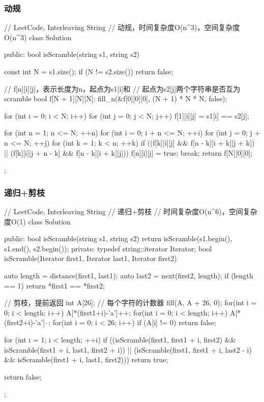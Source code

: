 \subsubsection{动规}
\begin{Code}
// LeetCode, Interleaving String
// 动规，时间复杂度O(n^3)，空间复杂度O(n^3)
class Solution {
public:
    bool isScramble(string s1, string s2) {
        const int N = s1.size();
        if (N != s2.size()) return false;

        // f[n][i][j]，表示长度为n，起点为s1[i]和
        // 起点为s2[j]两个字符串是否互为scramble
        bool f[N + 1][N][N];
        fill_n(&f[0][0][0], (N + 1) * N * N, false);

        for (int i = 0; i < N; i++)
            for (int j = 0; j < N; j++)
                f[1][i][j] = s1[i] == s2[j];

        for (int n = 1; n <= N; ++n) {
            for (int i = 0; i + n <= N; ++i) {
                for (int j = 0; j + n <= N; ++j) {
                    for (int k = 1; k < n; ++k) {
                        if ((f[k][i][j] && f[n - k][i + k][j + k]) ||
                                (f[k][i][j + n - k] && f[n - k][i + k][j])) {
                            f[n][i][j] = true;
                            break;
                        }
                    }
                }
            }
        }
        return f[N][0][0];
    }
};
\end{Code}


\subsubsection{递归+剪枝}
\begin{Code}
// LeetCode, Interleaving String
// 递归+剪枝
// 时间复杂度O(n^6)，空间复杂度O(1)
class Solution {
public:
    bool isScramble(string s1, string s2) {
        return isScramble(s1.begin(), s1.end(), s2.begin());
    }
private:
    typedef string::iterator Iterator;
    bool isScramble(Iterator first1, Iterator last1, Iterator first2) {
        auto length = distance(first1, last1);
        auto last2 = next(first2, length);
        if (length == 1) return *first1 == *first2;

        // 剪枝，提前返回
        int A[26]; // 每个字符的计数器
        fill(A, A + 26, 0);
        for(int i = 0; i < length; i++) A[*(first1+i)-'a']++;
        for(int i = 0; i < length; i++) A[*(first2+i)-'a']--;
        for(int i = 0; i < 26; i++) if (A[i] != 0) return false;

        for (int i = 1; i < length; ++i)
            if ((isScramble(first1, first1 + i, first2)
                 && isScramble(first1 + i, last1, first2 + i))
                    || (isScramble(first1, first1 + i, last2 - i)
                            && isScramble(first1 + i, last1, first2)))
                return true;

        return false;
    }
};
\end{Code}


